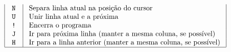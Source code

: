 \documentclass[a4paper]{article}
\begin{document}
$$\begin{array}{|c|l|}
\texttt{ N } & \text { Separa linha atual na posição do cursor } \\
\texttt{ U } & \text { Unir linha atual e a próxima } \\
\texttt{!} & \text { Encerra o programa } \\
\texttt{ J } & \text { Ir para próxima linha (manter a mesma coluna, se possível) } \\
\texttt{ H } & \text { Ir para a linha anterior (manter a mesma coluna, se possível) } \\
\hline
\end{array}
$$
\end{document}
